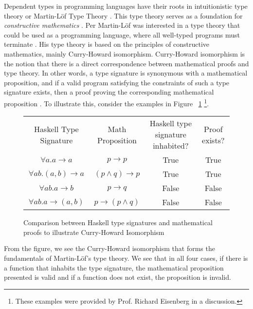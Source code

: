 Dependent types in programming languages have their roots in intuitionistic type
theory or Martin-L\"{o}f Type Theory \cite{intro_martin_lof,ml_type_theory}.
This type theory serves as a foundation for \textit{constructive mathematics}
\cite{martin_lof}. Per Martin-L\"{o}f was interested in a type theory that could
be used as a programming language, where all well-typed programs must terminate
\cite{ml_type_theory}. His type theory is based on the principles of
constructive mathematics, mainly Curry-Howard isomorphism. Curry-Howard
isomorphism is the notion that there is a direct correspondence between
mathematical proofs and type theory. In other words, a type signature is
synonymous with a mathematical proposition, and if a valid program satisfying
the constraints of such a type signature exists, then a proof proving the
corresponding mathematical proposition \cite{martin_lof,ml_type_theory}. To
illustrate this, consider the examples in Figure ~\ref{ml_type_theory_examples}
\footnote{These examples were provided by Prof. Richard Eisenberg in a
discussion.}. 

\begin{figure}[h]
    \label{ml_type_theory_examples}
    \caption{Comparison between Haskell type signatures and mathematical proofs to illustrate Curry-Howard Isomorphism}
    \begin{tabular}{c|c|c|c}
        Haskell Type Signature & Math Proposition & Haskell type signature inhabited? & Proof exists? \\
        $\forall a. a \rightarrow a$ & $p \rightarrow p$ & True & True \\
        $\forall ab. (a,b) \rightarrow a$ & $ (p \wedge q) \rightarrow p$ & True & True \\
        $\forall ab. a \rightarrow b$ & $p\rightarrow q$ & False & False \\
        $\forall ab. a \rightarrow (a,b)$ & $p \rightarrow (p\wedge q)$ & False & False 
    \end{tabular}
\end{figure}

From the figure, we see the Curry-Howard isomorphism that forms the fundamentals
of Martin-L\"{o}f's type theory. We see that in all four cases, if there is a
function that inhabits the type signature, the mathematical proposition
presented is valid and if a function does not exist, the proposition is invalid. 

